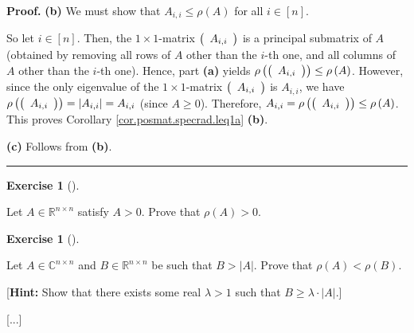 \documentclass[numbers=enddot,12pt,final,onecolumn,notitlepage]{scrartcl}%
\newcounter{exer}
\numberwithin{exer}{subsection}
\theoremstyle{definition}
\newtheorem{exmp}[exer]{Exercise}
\newenvironment{exercise}[1][]
{\begin{exmp}[#1]\begin{leftbar}}
{\end{leftbar}\end{exmp}}
\newenvironment{proof}[1][Proof]{\noindent\textbf{#1.} }{\ \rule{0.5em}{0.5em}}
\begin{document}
\begin{proof}
\textbf{(b)} We must show that $A_{i,i}\leq\rho\left(  A\right)  $ for all
$i\in\left[  n\right]  $.

So let $i\in\left[  n\right]  $. Then, the $1\times1$-matrix $\left(
\begin{array}
[c]{c}%
A_{i,i}%
\end{array}
\right)  $ is a principal submatrix of $A$ (obtained by removing all rows of
$A$ other than the $i$-th one, and all columns of $A$ other than the $i$-th
one). Hence, part \textbf{(a)} yields $\rho\left(  \left(
\begin{array}
[c]{c}%
A_{i,i}%
\end{array}
\right)  \right)  \leq\rho\left(  A\right)  $. However, since the only
eigenvalue of the $1\times1$-matrix $\left(
\begin{array}
[c]{c}%
A_{i,i}%
\end{array}
\right)  $ is $A_{i,i}$, we have $\rho\left(  \left(
\begin{array}
[c]{c}%
A_{i,i}%
\end{array}
\right)  \right)  =\left\vert A_{i,i}\right\vert =A_{i,i}$ (since $A\geq0$).
Therefore, $A_{i,i}=\rho\left(  \left(
\begin{array}
[c]{c}%
A_{i,i}%
\end{array}
\right)  \right)  \leq\rho\left(  A\right)  $. This proves Corollary
\ref{cor.posmat.specrad.leq1a} \textbf{(b)}.  \medskip

\textbf{(c)} Follows from \textbf{(b)}.
\end{proof}

\begin{exercise}
 Let $A\in\mathbb{R}^{n\times n}$ satisfy $A>0$. Prove that
$\rho\left(  A\right)  >0$.
\end{exercise}

\begin{exercise}
 Let $A\in\mathbb{C}^{n\times n}$ and $B\in\mathbb{R}^{n\times n}$ be
such that $B>\left\vert A\right\vert $. Prove that $\rho\left(  A\right)
<\rho\left(  B\right)  $. \medskip

[\textbf{Hint:} Show that there exists some real $\lambda>1$ such that
$B\geq\lambda\cdot\left\vert A\right\vert $.]
\end{exercise}

[...]

\newpage
\end{document}
